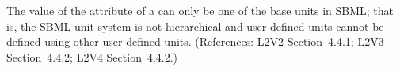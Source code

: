 The value of the  attribute of a \Unit can only be
one of the base units in SBML; that is, the SBML unit
system is not hierarchical and user-defined units cannot be defined using
other user-defined units.  (References: L2V2 Section~4.4.1;
L2V3 Section~4.4.2; L2V4 Section~4.4.2.)
